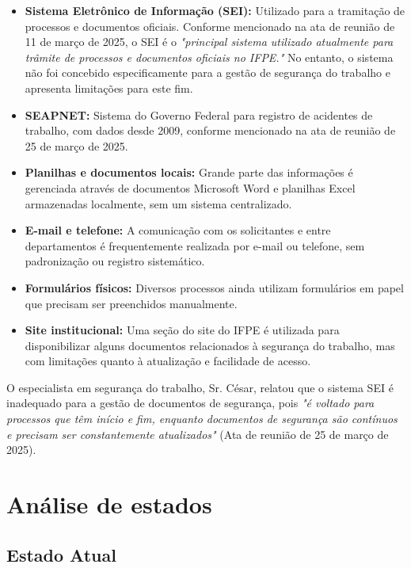 \documentclass[12pt,a4paper]{article}
\begin{document}
\begin{itemize}
    \item \textbf{Sistema Eletrônico de Informação (SEI):} Utilizado para a tramitação de processos e documentos oficiais. Conforme mencionado na ata de reunião de 11 de março de 2025, o SEI é o \textit{"principal sistema utilizado atualmente para trâmite de processos e documentos oficiais no IFPE."} No entanto, o sistema não foi concebido especificamente para a gestão de segurança do trabalho e apresenta limitações para este fim.
    
    \item \textbf{SEAPNET:} Sistema do Governo Federal para registro de acidentes de trabalho, com dados desde 2009, conforme mencionado na ata de reunião de 25 de março de 2025.
    
    \item \textbf{Planilhas e documentos locais:} Grande parte das informações é gerenciada através de documentos Microsoft Word e planilhas Excel armazenadas localmente, sem um sistema centralizado.
    
    \item \textbf{E-mail e telefone:} A comunicação com os solicitantes e entre departamentos é frequentemente realizada por e-mail ou telefone, sem padronização ou registro sistemático.
    
    \item \textbf{Formulários físicos:} Diversos processos ainda utilizam formulários em papel que precisam ser preenchidos manualmente.
    
    \item \textbf{Site institucional:} Uma seção do site do IFPE é utilizada para disponibilizar alguns documentos relacionados à segurança do trabalho, mas com limitações quanto à atualização e facilidade de acesso.
\end{itemize}

O especialista em segurança do trabalho, Sr. César, relatou que o sistema SEI é inadequado para a gestão de documentos de segurança, pois \textit{"é voltado para processos que têm início e fim, enquanto documentos de segurança são contínuos e precisam ser constantemente atualizados"} (Ata de reunião de 25 de março de 2025).

\newpage
\section{Análise de estados}

\subsection{Estado Atual}
\end{document}
